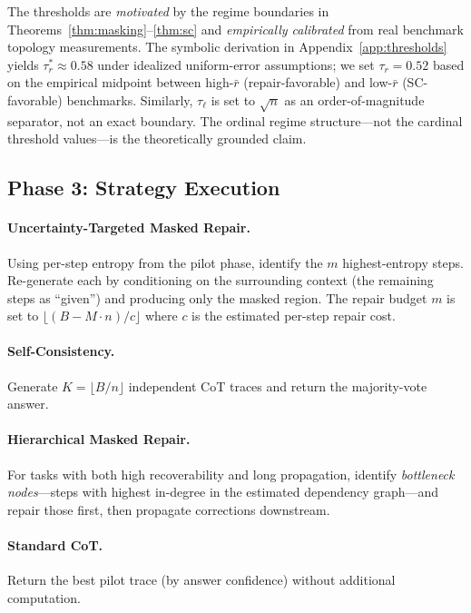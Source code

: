 \documentclass{article}
\begin{document}
The thresholds are \emph{motivated} by the regime boundaries in Theorems~\ref{thm:masking}--\ref{thm:sc} and \emph{empirically calibrated} from real benchmark topology measurements. The symbolic derivation in Appendix~\ref{app:thresholds} yields $\tau_r^* \approx 0.58$ under idealized uniform-error assumptions; we set $\tau_r = 0.52$ based on the empirical midpoint between high-$\bar{r}$ (repair-favorable) and low-$\bar{r}$ (SC-favorable) benchmarks. Similarly, $\tau_\ell$ is set to $\sqrt{n}$ as an order-of-magnitude separator, not an exact boundary. The ordinal regime structure---not the cardinal threshold values---is the theoretically grounded claim.

\subsection{Phase 3: Strategy Execution}

\paragraph{Uncertainty-Targeted Masked Repair.} Using per-step entropy from the pilot phase, identify the $m$ highest-entropy steps. Re-generate each by conditioning on the surrounding context (the remaining steps as ``given'') and producing only the masked region. The repair budget $m$ is set to $\lfloor (B - M \cdot n) / c \rfloor$ where $c$ is the estimated per-step repair cost.

\paragraph{Self-Consistency.} Generate $K = \lfloor B / n \rfloor$ independent CoT traces and return the majority-vote answer.

\paragraph{Hierarchical Masked Repair.} For tasks with both high recoverability and long propagation, identify \emph{bottleneck nodes}---steps with highest in-degree in the estimated dependency graph---and repair those first, then propagate corrections downstream.

\paragraph{Standard CoT.} Return the best pilot trace (by answer confidence) without additional computation.
\end{document}
